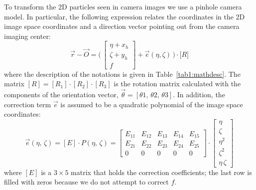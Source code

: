 \documentclass[10pt,a4paper]{article}
\begin{document}
To transform the 2D particles seen in camera images we use a pinhole camera model. In particular, the following expression relates the coordinates in the 2D image space coordinates and a direction vector pointing out from the camera imaging center:
%
\begin{equation}
\vec{r}-\vec{O} = \Big( \, 
\begin{bmatrix}
\eta + x_h\\
\zeta + y_h \\
f
\end{bmatrix}
+ \vec{e}(\eta, \zeta) \,\Big) \cdot \Big[ R \Big]
\label{eq:3dmodel}
\end{equation}
%
where the description of the notations is given in Table~\ref{tab1:mathdesc}. The matrix $[R]= [R_1]\cdot [R_2] \cdot [R_3]$ is the rotation matrix calculated with the components of the orientation vector, $\vec{\theta} = [\theta 1,\, \theta 2,\, \theta 3]$. In addition, the correction term $\vec{e}$ is assumed to be a quadratic polynomial of the image space coordinates:
%
\begin{equation}
\vec{e}(\eta,\,\zeta) = [E]\cdot P(\eta,\,\zeta) =
\begin{bmatrix}
E_{11} & E_{12} & E_{13} & E_{14} & E_{15}\\
E_{21} & E_{22} & E_{23} & E_{24} & E_{25}\\
0 & 0 & 0 & 0 & 0
\end{bmatrix}
\cdot 
\begin{bmatrix}
\eta\\
\zeta\\
\eta^2\\
\zeta^2\\
\eta\,\zeta
\end{bmatrix}
\end{equation}
%
where $[E]$ is a $3\times5$ matrix that holds the correction coefficients; the last row is filled with zeros because we do not attempt to correct $f$.
\end{document}
